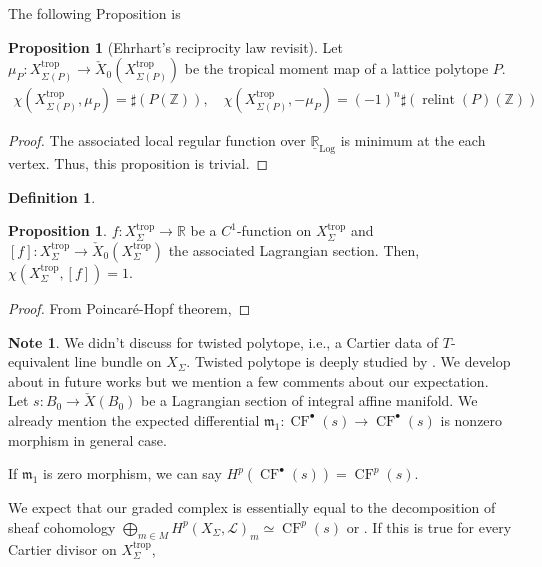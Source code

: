 \documentclass[a4paper,dvipdfmx,reqno,12pt]{amsart}
\theoremstyle{definition}
\newtheorem{Def}[Thm]{Definition}
\newtheorem{Prop}[Thm]{Proposition}
\newtheorem{Note}[Thm]{Note}
\newcommand{\R}{\mathbb{R}}%
\newcommand{\Z}{\mathbb{Z}}%
\newcommand{\mcal}[1]{\mathcal{#1}}%
\newcommand{\mf}[1]{\mathfrak{#1}}%
\newcommand{\opn}[1]{\operatorname{#1}}
\numberwithin{equation}{section}
\begin{document}
The following Proposition is

\begin{Prop}[Ehrhart's reciprocity law revisit]
  Let $\mu_P: X_{\Sigma (P)}^{\opn{trop}}
    \to \check{X}_0(X_{\Sigma (P)}^{\opn{trop}})$
  be the tropical moment map of a lattice polytope $P$.
  \begin{align}
    \chi(X_{\Sigma(P)}^{\opn{trop}},\mu_P)=\sharp (P(\Z)),
    \quad \chi(X_{\Sigma(P)}^{\opn{trop}},-\mu_P)=(-1)^{n}\sharp (\opn{relint}(P)(\Z))
  \end{align}
\end{Prop}
\begin{proof}
  The associated local regular function over $\underline{\R}_{\opn{Log}}$ is minimum at the each vertex.
  Thus, this proposition is trivial.
\end{proof}
\begin{Def}

\end{Def}

\begin{Prop}
  $f:X_{\Sigma}^{\opn{trop}}\to \R$ be a $C^{1}$-function on $X_{\Sigma}^{\opn{trop}}$ and $[f]:X_{\Sigma}^{\opn{trop}} \to \check{X}_0(X_{\Sigma}^{\opn{trop}})$ the associated Lagrangian section.
  Then, $\chi(X_{\Sigma}^{\opn{trop}},[f])=1$.
\end{Prop}
\begin{proof}
  From Poincar\'e-Hopf theorem,
\end{proof}

\begin{Note}
  We didn't discuss for twisted polytope, i.e., a Cartier data of $T$-equivalent line bundle on $X_{\Sigma}$.
  Twisted polytope is deeply studied by \cite{MR1243782}.
  We develop about in future works but we mention a few comments about our expectation.
  Let $s:B_0 \to \check{X}(B_0)$ be a Lagrangian section of integral affine manifold.
  We already mention the expected differential $\mf{m}_1: \opn{CF}^{\bullet}(s)\to \opn{CF}^{\bullet}(s)$ is nonzero morphism in general case.

  If $\mf{m}_1$ is zero morphism, we can say $H^{p}(\opn{CF}^{\bullet}(s))=\opn{CF}^{p}(s)$.

  We expect that our graded complex is essentially
  equal to the decomposition of sheaf cohomology
  $\bigoplus_{m\in M}H^{p}(X_{\Sigma},\mcal{L})_m\simeq \opn{CF}^{p}(s)$ \cite[Theorem 9.1.3]{coxToricVarieties2011a}
  or \cite{MR1243782}.
  If this is true for every Cartier divisor on $X^{\opn{trop}}_{\Sigma}$,

\end{Note}
\end{document}
